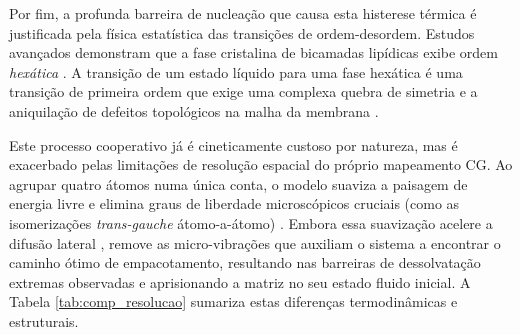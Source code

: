\documentclass[12pt]{article} %
\begin{document}
Por fim, a profunda barreira de nucleação que causa esta histerese térmica é justificada pela física estatística das transições de ordem-desordem. Estudos avançados demonstram que a fase cristalina de bicamadas lipídicas exibe ordem \textit{hexática} \cite{katira2015}. A transição de um estado líquido para uma fase hexática é uma transição de primeira ordem que exige uma complexa quebra de simetria e a aniquilação de defeitos topológicos na malha da membrana \cite{katira2015}. 

Este processo cooperativo já é cineticamente custoso por natureza, mas é exacerbado pelas limitações de resolução espacial do próprio mapeamento CG. Ao agrupar quatro átomos numa única conta, o modelo suaviza a paisagem de energia livre e elimina graus de liberdade microscópicos cruciais (como as isomerizações \textit{trans-gauche} átomo-a-átomo) \cite{marrink2022}. Embora essa suavização acelere a difusão lateral \cite{marrink2022}, remove as micro-vibrações que auxiliam o sistema a encontrar o caminho ótimo de empacotamento, resultando nas barreiras de dessolvatação extremas observadas e aprisionando a matriz no seu estado fluido inicial. A Tabela \ref{tab:comp_resolucao} sumariza estas diferenças termodinâmicas e estruturais.

\begin{table}[htpb]
\centering
\caption{Comparativo Estrutural e Termodinâmico: DPPC vs. DSPC sob Alta Hidratação (45W\_L). A retenção da APL no DSPC reflete a montagem inicial do sistema aliada à maior inércia das contas regulares.}
\label{tab:comp_resolucao}
\end{table}
\end{document}
